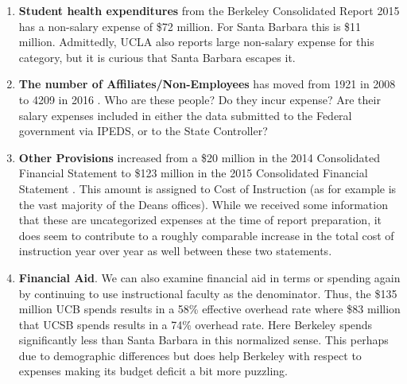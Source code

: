 \documentclass[11pt]{article}
\begin{document}
\begin{enumerate}
\item
{\bf Student health expenditures} from the Berkeley Consolidated
Report \cite{UCB-consolidated}  2015 has a non-salary expense of
\$72 million.  For Santa Barbara \cite{UCSB-consolidated} this is
\$11 million. Admittedly, UCLA  \cite{UCLA-consolidated}
also reports large non-salary expense for this category, but it
is curious that Santa Barbara escapes it.

\item
{\bf The number of Affiliates/Non-Employees} has moved from 1921 in
2008 to 4209 in 2016 \cite{cal-answer-census}.  Who are these people?
Do they incur expense? Are their salary expenses included in either
the data submitted to the Federal government via IPEDS, or to the
State Controller?

\item
{\bf Other Provisions} increased from a \$20 million in the 2014 Consolidated
Financial Statement \cite{UCB-consolidated-14} to \$123 million in the 2015
Consolidated Financial Statement \cite{UCB-consolidated}.  This amount
is assigned to Cost of Instruction (as for example is the vast
majority of the Deans offices).  While we received some information
that these are uncategorized expenses at the time of report preparation,
it does seem to contribute to a roughly comparable increase in the
total cost of instruction year over year as well between these two statements.

\item
{\bf Financial Aid}. We can also examine financial aid in terms or
spending again by continuing to use instructional faculty as the
denominator.  Thus, the \$135 million UCB spends results in a 58\%
effective overhead rate where \$83 million that UCSB spends results in
a 74\% overhead rate.  Here Berkeley spends significantly less than
Santa Barbara in this normalized sense.  This perhaps due to demographic
differences but does help Berkeley with respect to expenses making
its budget deficit a bit more puzzling. 


\end{enumerate}


\end{document}
